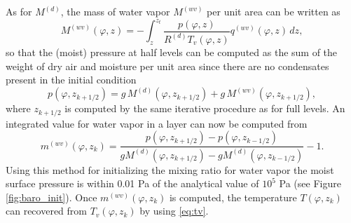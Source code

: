 \documentclass{agujournal}
\begin{document}
{As for $M^{(d)}$, the mass of water vapor $M^{(wv)}$ per unit area can be written as
\begin{equation}
{M}^{(wv)}(\varphi,z)=-\int_z^{z_t}\frac{p(\varphi,z)}{R^{(d)} T_v(\varphi,z)}q^{(wv)}(\varphi,z)\, dz,\label{eq:Upvw}
\end{equation}
so that the (moist) pressure at half levels can be computed as the sum of the weight of dry air and moisture per unit area  since there are no condensates present in the initial condition
\begin{equation}
p(\varphi,z_{k+1/2})=g\, {M}^{(d)}(\varphi,z_{k+1/2})+g\, {M}^{(wv)}(\varphi,z_{k+1/2}),
\end{equation}
where $z_{k+1/2}$ is computed by the same iterative procedure as for full levels. An integrated value for water vapor in a layer can now be computed from
\begin{equation}
m^{(wv)}(\varphi,z_k)=\frac{p(\varphi,z_{k+1/2})-p(\varphi,z_{k-1/2})}{g{M}^{(d)}(\varphi,z_{k+1/2})-g{M}^{(d)}(\varphi,z_{k-1/2})}-1.
\end{equation}
Using this method for initializing the mixing ratio for water vapor the moist surface pressure is within 0.01 Pa of the analytical value of $10^5$ Pa (see Figure \ref{fig:baro_init}). Once $m^{(wv)}(\varphi,z_k)$ is computed, the temperature $T(\varphi,z_k)$ can recovered from $T_v(\varphi,z_k)$ by using \eqref{eq:tv}.

}
\end{document}
